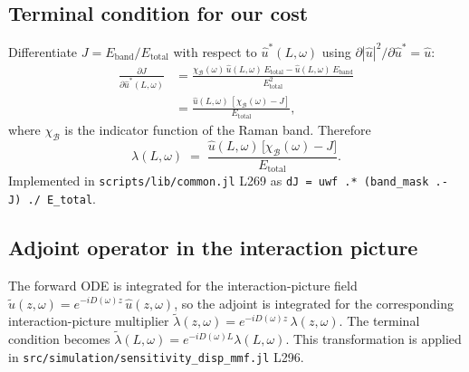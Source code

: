 \documentclass[11pt]{article}
\providecommand{\pdv}[2]{\frac{\partial #1}{\partial #2}}
\newcommand{\uhat}{\hat{u}}
\newcommand{\utilde}{\tilde{u}}
\begin{document}
\subsection{Terminal condition for our cost}

Differentiate $J = E_\text{band}/E_\text{total}$ with respect to $\uhat^*(L,\omega)$
using $\partial |\uhat|^2 / \partial \uhat^* = \uhat$:
\begin{align*}
  \pdv{J}{\uhat^*(L,\omega)}
  &= \frac{\chi_\mathcal{B}(\omega)\,\uhat(L,\omega)\,E_\text{total}
            - \uhat(L,\omega)\,E_\text{band}}
           {E_\text{total}^2} \\[0.3em]
  &= \frac{\uhat(L,\omega)\,[\chi_\mathcal{B}(\omega) - J]}{E_\text{total}},
\end{align*}
where $\chi_\mathcal{B}$ is the indicator function of the Raman band.
Therefore
\begin{equation}
  \lambda(L,\omega)
  \;=\; \frac{\uhat(L,\omega)\,\bigl[\chi_\mathcal{B}(\omega) - J\bigr]}
              {E_\text{total}}.
  \label{eq:terminal_explicit}
\end{equation}
Implemented in \texttt{scripts/lib/common.jl} L269 as
\texttt{dJ = uwf .* (band\_mask .- J) ./ E\_total}.

\subsection{Adjoint operator in the interaction picture}

The forward ODE is integrated for the interaction-picture field
$\utilde(z,\omega) = e^{-iD(\omega)z}\,\uhat(z,\omega)$, so the adjoint is
integrated for the corresponding interaction-picture multiplier
$\tilde{\lambda}(z,\omega) = e^{-iD(\omega)z}\,\lambda(z,\omega)$. The terminal
condition becomes $\tilde{\lambda}(L,\omega) = e^{-iD(\omega)L}\lambda(L,\omega)$.
This transformation is applied in
\texttt{src/simulation/sensitivity\_disp\_mmf.jl} L296.
\end{document}
